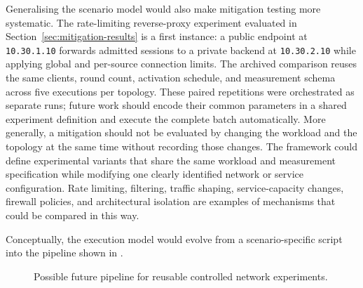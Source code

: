 Generalising the scenario model would also make mitigation testing more
systematic. The rate-limiting reverse-proxy experiment evaluated in
Section~\ref{sec:mitigation-results} is a first instance: a public endpoint at
\texttt{10.30.1.10} forwards admitted sessions to a private backend at
\texttt{10.30.2.10} while applying global and per-source connection limits.
The archived comparison reuses the same clients, round count, activation
schedule, and measurement schema across five executions per topology. These
paired repetitions were orchestrated as separate runs; future work should
encode their common parameters in a shared experiment definition and execute
the complete batch automatically.
More generally, a mitigation should not be evaluated by changing the workload
and the topology at the same time without recording those changes. The
framework could define experimental variants that share the same workload and
measurement specification while modifying one clearly identified network or
service configuration. Rate limiting, filtering, traffic shaping,
service-capacity changes, firewall policies, and architectural isolation are
examples of mechanisms that could be compared in this way.

Conceptually, the execution model would evolve from a scenario-specific script
into the pipeline shown in .

\begin{figure}[htbp]
\centering
{}
\caption{Possible future pipeline for reusable controlled network experiments.}
\label{fig:future-experiment-pipeline}
\end{figure}

